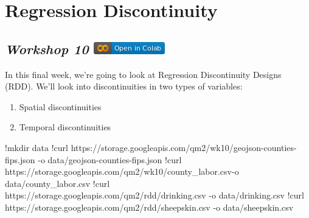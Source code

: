 \documentclass[
  letterpaper,
  DIV=11,
  numbers=noendperiod]{scrreprt}
\newenvironment{Shaded}{\begin{snugshade}}{\end{snugshade}}
\newcommand{\NormalTok}[1]{\textcolor[rgb]{0.00,0.23,0.31}{#1}}
\newcommand{\OperatorTok}[1]{\textcolor[rgb]{0.37,0.37,0.37}{#1}}
\providecommand{\tightlist}{%
  \setlength{\itemsep}{0pt}\setlength{\parskip}{0pt}}\usepackage{longtable,booktabs,array}
\begin{document}

\hypertarget{regression-discontinuity}{%
\chapter{Regression Discontinuity}\label{regression-discontinuity}}

\hypertarget{workshop-10-open-in-colab}{%
\section[\emph{Workshop 10} ]{\texorpdfstring{\emph{Workshop 10}
\href{https://colab.research.google.com/github/oballinger/QM2/blob/main/notebooks/W10.\%20Regression\%20Discontinuity.ipynb}{\protect\includegraphics{index_files/mediabag/colab-badge.png}}}{Workshop 10 Open In Colab}}\label{workshop-10-open-in-colab}}

In this final week, we're going to look at Regression Discontinuity
Designs (RDD). We'll look into discontinuities in two types of
variables:

\begin{enumerate}
\def\labelenumi{\arabic{enumi}.}
\tightlist
\item
  Spatial discontinuities
\item
  Temporal discontinuities
\end{enumerate}

\begin{Shaded}
\begin{Highlighting}[]
\OperatorTok{!}\NormalTok{mkdir data}
\OperatorTok{!}\NormalTok{curl https:}\OperatorTok{//}\NormalTok{storage.googleapis.com}\OperatorTok{/}\NormalTok{qm2}\OperatorTok{/}\NormalTok{wk10}\OperatorTok{/}\NormalTok{geojson}\OperatorTok{{-}}\NormalTok{counties}\OperatorTok{{-}}\NormalTok{fips.json }\OperatorTok{{-}}\NormalTok{o data}\OperatorTok{/}\NormalTok{geojson}\OperatorTok{{-}}\NormalTok{counties}\OperatorTok{{-}}\NormalTok{fips.json}
\OperatorTok{!}\NormalTok{curl https:}\OperatorTok{//}\NormalTok{storage.googleapis.com}\OperatorTok{/}\NormalTok{qm2}\OperatorTok{/}\NormalTok{wk10}\OperatorTok{/}\NormalTok{county\_labor.csv}\OperatorTok{{-}}\NormalTok{o data}\OperatorTok{/}\NormalTok{county\_labor.csv}
\OperatorTok{!}\NormalTok{curl https:}\OperatorTok{//}\NormalTok{storage.googleapis.com}\OperatorTok{/}\NormalTok{qm2}\OperatorTok{/}\NormalTok{rdd}\OperatorTok{/}\NormalTok{drinking.csv }\OperatorTok{{-}}\NormalTok{o data}\OperatorTok{/}\NormalTok{drinking.csv}
\OperatorTok{!}\NormalTok{curl https:}\OperatorTok{//}\NormalTok{storage.googleapis.com}\OperatorTok{/}\NormalTok{qm2}\OperatorTok{/}\NormalTok{rdd}\OperatorTok{/}\NormalTok{sheepskin.csv }\OperatorTok{{-}}\NormalTok{o data}\OperatorTok{/}\NormalTok{sheepskin.csv}
\end{Highlighting}
\end{Shaded}
\end{document}
